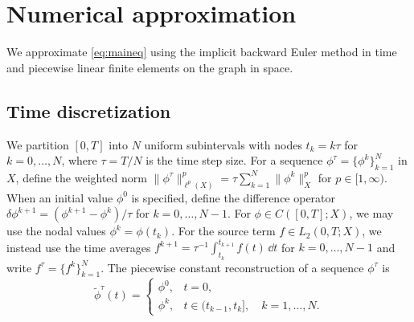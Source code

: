 \documentclass[numbers,webpdf]{ima-authoring-template}%
\theoremstyle{thmstyletwo}%
\numberwithin{equation}{section}
\begin{document}
\section{Numerical approximation}
\label{numericalapproxsec}
We approximate \eqref{eq:maineq} using the implicit backward Euler method in time and piecewise linear finite elements on the graph in space.

\subsection{Time discretization}
We partition $[0,T]$ into $N$ uniform subintervals with nodes $t_k=k\tau$ for $k=0,\dots,N$, where $\tau=T/N$ is the time step size. For a sequence $\phi^\tau=\{\phi^k\}_{k=1}^N$ in $X$, define the weighted norm $\|\phi^\tau\|^p_{\ell^p(X)} =\tau\sum_{k=1}^N\|\phi^k\|_X^p$ for $p\in[1,\infty)$. When an initial value $\phi^0$ is specified, define the difference operator $\delta\phi^{k+1} = (\phi^{k+1}-\phi^{k})/\tau$ for $k=0,\dots, N-1$. For $\phi\in C([0,T];X)$, we may use the nodal values $\phi^k=\phi(t_k)$. For the source term
$f\in L_2(0,T;X)$, we instead use the time averages $f^{k+1}=\tau^{-1}\int_{t_k}^{t_{k+1}}f(t)\,\dd t$ for $k=0,\dots,N-1$ and write $f^\tau=\{f^k\}_{k=1}^N$. The piecewise constant reconstruction of a sequence $\phi^\tau$ is
\begin{equation}
\label{def:piecewise_constant}
    \tilde{\phi}^\tau(t)=
    \begin{cases}
        \phi^0, & t=0,\\
        \phi^k, & t\in(t_{k-1},t_k],\quad k=1,\dots,N.
    \end{cases}
\end{equation}
 
\end{document}
